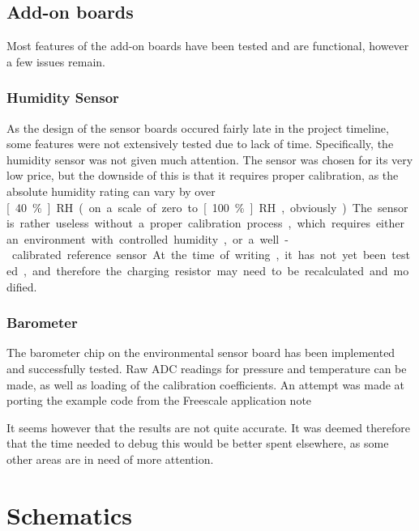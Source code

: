 \subsection{Add-on boards}
Most features of the add-on boards have been tested and are functional, however
a few issues remain.

\subsubsection{Humidity Sensor}
\label{sub2:humidity}
As the design of the sensor boards occured fairly late in the project timeline,
some features were not extensively tested due to lack of time. Specifically, the
humidity sensor was not given much attention. The sensor was chosen for its very
low price, but the downside of this is that it requires proper calibration, as
the absolute humidity rating can vary by over \unit[40\%]{RH} (on a scale of
zero to \unit[100\%]{RH}, obviously). The sensor is rather useless without a
proper calibration process, which requires either an environment with controlled
humidity, or a well-calibrated reference sensor. At the time of writing, it has
not yet been tested, and therefore the charging resistor may need to be
recalculated and modified.

\subsubsection{Barometer}
\label{sub2:barometer}
The barometer chip on the environmental sensor board has been implemented and
successfully tested. Raw ADC readings for pressure and temperature can be made,
as well as loading of the calibration coefficients. An attempt was made
at porting the example code from the Freescale application
note\cite{freescale3785}

It seems however that the results are not quite accurate. It was deemed
therefore that the time needed to debug this would be better spent elsewhere, as
some other areas are in need of more attention.

\pagebreak
\section{Schematics}

